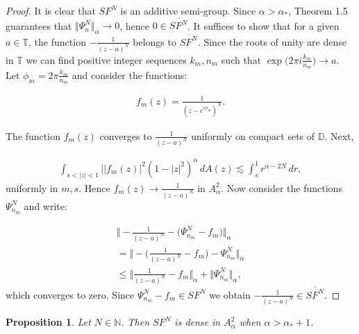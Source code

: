 \documentclass{amsart}[11pt]
\newcommand{\N}{\mathbb{N}} %
\newcommand{\D}{\mathbb{D}} %
\newcommand{\T}{\mathbb{T}} %
\newcommand{\ra}{\rightarrow}
\newtheorem{proposition}[theorem]{Proposition}
\theoremstyle{definition}
\begin{document}
\begin{proof}
It is clear that $SF^N$ is an additive semi-group. Since $\alpha > \alpha_{\ast}$, Theorem 1.5 guarantees that $\Vert \Psi_n^N \Vert_{\alpha} \ra 0$, hence $0 \in \overline{SF^N}$. It suffices to show that for a given $a \in \T$, the function $- \frac{1}{(z-a)^N}$ belongs to  $\overline{SF^N}$. Since the roots of unity are dense in $\T$ we can find positive integer sequences $k_m, n_m$ such that $ \exp{\bigg( 2\pi i \frac{k_m}{n_m} \bigg)} \ra a$. Let $\phi_m =  2\pi \frac{k_m}{n_m}$ and consider the functions:

\begin{gather*}
    f_m(z) = \frac{1}{(z-e^{i\phi_m})^N}.
\end{gather*}

The function $f_m(z)$ converges to $\frac{1}{(z-a)^N}$ uniformly on compact sets of $\D$. Next,

\begin{gather*}
    \int_{s < |z| <1 }\bigg| |f_m(z)|^2 (1-|z|^2)^{\alpha} \,dA(z) \lesssim \int_s^1 r^{\alpha - 2N} \,dr,
\end{gather*}
uniformly in $m,s$. Hence $f_m(z) \ra \frac{1}{(z-a)^N}$ in $A^2_{\alpha}$. Now consider the functions $\Psi_{n_m}^N$ and write:

\begin{gather*}
    \bigg\Vert - \frac{1}{(z-a)^N} - \bigg(\Psi_{n_m}^N - f_m \bigg)  \bigg\Vert_{\alpha} \\
      = \bigg\Vert - \bigg( \frac{1}{(z-a)^N}- f_m\bigg) - \Psi_{n_m}^N  \bigg\Vert_{\alpha} \\
       \leq \bigg\Vert  \frac{1}{(z-a)^N}- f_m \bigg\Vert_{\alpha} + \bigg\Vert  \Psi_{n_m}^N  \bigg\Vert_{\alpha},
\end{gather*}
which converges to zero. Since $\Psi_{n_m}^N - f_m \in SF^N$ we obtain $- \frac{1}{(z-a)^N} \in \overline{SF^N}$.
\end{proof}

\begin{proposition}
Let $N \in \N$. Then $SF^N$ is dense in $A^2_{\alpha}$ when $\alpha > \alpha_{\ast}+1$.
\end{proposition}
\end{document}
